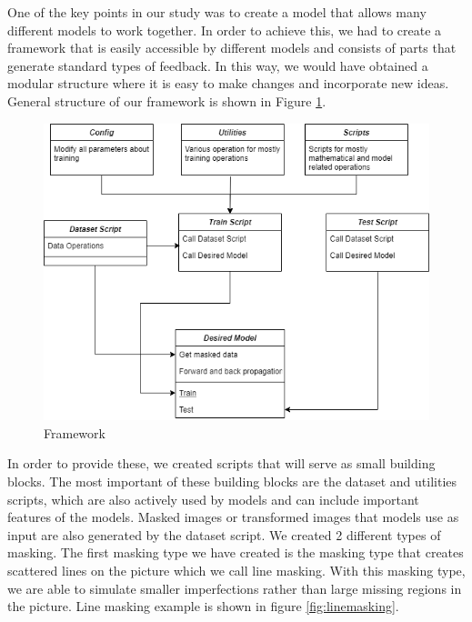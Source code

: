One of the key points in our study was to create a model that allows many different models to work together. In order to achieve this, we had to create a framework that is easily accessible by different models and consists of parts that generate standard types of feedback. In this way, we would have obtained a modular structure where it is easy to make changes and incorporate new ideas. General structure of our framework is shown in Figure \ref{fig:framework}.

\begin{figure}[h!]
    \centering
    \includegraphics[scale=0.55]{figures/chapter5/framework (1).png}
    \vspace*{4mm}
    \caption{Framework}
    \label{fig:framework}
\end{figure}
In order to provide these, we created scripts that will serve as small building blocks. The most important of these building blocks are the dataset and utilities scripts, which are also actively used by models and can include important features of the models.
\newline
Masked images or transformed images that models use as input are also generated by the dataset script. We created 2 different types of masking. The first masking type we have created is the masking type that creates scattered lines on the picture which we call line masking. With this masking type, we are able to simulate smaller imperfections rather than large missing regions in the picture. Line masking example is shown in figure \ref{fig:linemasking}.


